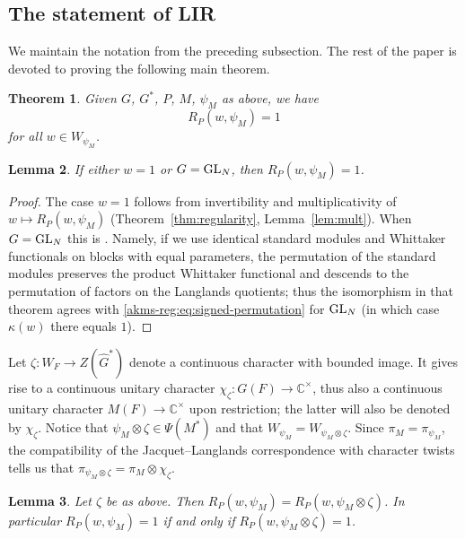 \documentclass[11pt,reqno]{amsart}
\theoremstyle{plain}
\newtheorem{thm}{Theorem}[section]
\newtheorem{lem}[thm]{Lemma}
\theoremstyle{definition}
\newcommand{\C}{\mathbb{C}}
\newcommand{\GL}{\tu{GL}}
\newcommand{\tu}{\textup}
\newcommand{\ra}{\rightarrow}
\renewcommand{\hat}{\widehat}
\numberwithin{equation}{subsection}
\begin{document}
\subsection{The statement of LIR}

We maintain the notation from the preceding subsection. The rest of the paper is devoted to proving the following main theorem.

\begin{thm}\label{thm:LIR}
Given $G$, $G^*$, $P$, $M$, $\psi_M$ as above, we have
\[
\tag{LIR}
R_P(w,\psi_M)=1
\]
for all $w \in W_{\psi_M}$. 
\end{thm}


\begin{lem}\label{lem:easy-case}
If either $w=1$ or $G=\GL_N$, 
then $R_P(w,\psi_M)=1$.
\end{lem}

\begin{proof}
The case $w=1$ follows from invertibility and multiplicativity of $w\mapsto R_P(w,\psi_M)$ (Theorem~\ref{thm:regularity}, Lemma~\ref{lem:mult}). When $G=\GL_N$ this is \cite[Thm.~3.5.1]{AGIKMS}. Namely, if we use identical standard
modules and Whittaker functionals on blocks with equal parameters, the permutation of the standard modules preserves the product Whittaker functional and descends to the permutation of factors on the Langlands quotients; thus the isomorphism in that theorem agrees with \eqref{akms-reg:eq:signed-permutation} for $\GL_N$ (in which case $\kappa(w)$ there equals $1$).

\end{proof}

Let $\zeta\colon W_F\ra Z(\hat G^*)$ denote a continuous character with bounded image. It gives rise to a continuous unitary character
$\chi_\zeta\colon G(F)\to \C^\times$, thus also a continuous unitary character $M(F)\to \C^\times$ upon restriction; the latter will also be denoted by $\chi_\zeta$. Notice that $\psi_M\otimes\zeta\in \Psi(M^*)$ and that $W_{\psi_M}=W_{\psi_M\otimes \zeta}$. Since $\pi_M = \pi_{\psi_M}$,
the compatibility of the Jacquet--Langlands correspondence with character twists tells us that 
$\pi_{\psi_M \otimes \zeta} = \pi_M \otimes \chi_\zeta$.

\begin{lem}\label{lem:character-twist}
Let $\zeta$ be as above. Then $R_P(w,\psi_M)=R_P(w,\psi_M\otimes \zeta)$. In particular $R_P(w,\psi_M)=1$ if and only if $R_P(w,\psi_M\otimes \zeta)=1$.
\end{lem}
\end{document}
